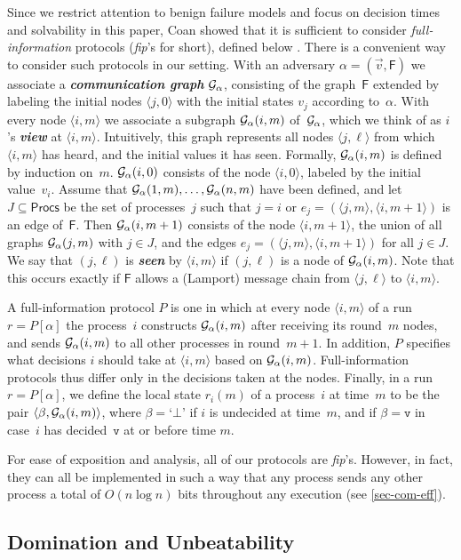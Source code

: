 \documentclass[11pt]{article}
\theoremstyle{definition}
\newcommand{\mv}{\mathtt{v}}
\newcommand{\defemph}[1]{\textbf{\textit{#1}}}
\newcommand{\Proc}{\mathsf{Procs}}
\newcommand{\CG}{{\cal G}}
\newcommand{\FP}{\mathsf{F}}
\newcommand{\node}[1]{\langle#1\rangle}
\newcommand{\Ga}{\CG_\alpha}
\newcommand{\fip}{{\it fip}}
\begin{document}
Since we restrict attention to benign failure models and focus on decision times and solvability in this paper, Coan showed that it is sufficient to consider {\em full-information} protocols ({\em fip}'s for short), defined below \cite{Coan}.
There is a convenient way to consider such protocols in our setting.
With an adversary $\alpha=(\vec{v},\FP)$ we associate a \defemph{communication graph}
$\CG_\alpha$,
consisting of the graph~$\FP$ extended by labeling the initial nodes $\node{j,0}$ with the initial states $v_j$ according to~$\alpha$.
With every node $\node{i,m}$ we associate a subgraph  $\Ga(i,m)$ of~$\CG_\alpha$, which we think of as $i$'s
\defemph{view} at $\node{i,m}$.
Intuitively, this graph
represents
all nodes $\node{j,\ell}$ from which $\node{i,m}$ has heard, and the initial values it has seen.
Formally, $\Ga(i,m)$ is defined by induction on~$m$.
$\Ga(i,0)$ consists of the node $\node{i,0}$, labeled by the initial value~$v_i$.
Assume that $\Ga(1,m),\ldots,\Ga(n,m)$ have been defined, and let $J\subseteq\Proc$ be the set of processes~$j$ such that $j=i$ or $e_j=(\node{j,m},\node{i,m+1})$ is an edge of~$\FP$. Then
$\Ga(i,m+1)$ consists of the node $\node{i,m+1}$, the union of all graphs $\Ga(j,m)$ with $j\in J$, and the edges
$e_j=(\node{j,m},\node{i,m+1})$ for all $j\in J$.
We say that $(j,\ell)$ is
\defemph{seen} by $\node{i,m}$ if $(j,\ell)$ is a node of $\Ga(i,m)$. Note that this occurs exactly
if $\FP$ allows a (Lamport) message chain from $\node{j,\ell}$ to $\node{i,m}$.

A full-information protocol $P$ is one in which at every node $\node{i,m}$ of a run $r=P[\alpha]$ the process~$i$ constructs $\Ga(i,m)$ after receiving its round~$m$ nodes, and sends $\Ga(i,m)$ to all other processes in round~\mbox{$m+1$}. In addition, $P$ specifies what decisions $i$ should take at $\node{i,m}$ based on $\Ga(i,m)$.
Full-information protocols thus differ only in the decisions taken at the nodes.
Finally, in a run $r=P[\alpha]$, we define the local state $r_i(m)$ of a process~$i$ at time~$m$ to be the pair
$\langle \beta,\Ga(i,m)\rangle$, where $\beta=\mbox{`}\bot\mbox{'}$ if $i$ is undecided at time~$m$, and if $\beta=\mv$ in case~$i$ has decided~$\mv$
at or before time $m$.

For ease of exposition and analysis, all of our  protocols are
\fip's.
However, in fact, they can all be implemented in such a way that any process sends any other
process a total of $O(n\log n)$ bits throughout any execution
(see \cref{sec-com-eff}).

\subsection{Domination and Unbeatability}
\end{document}
